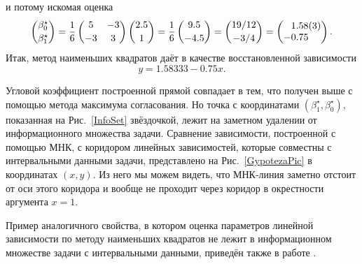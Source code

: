 \documentclass[a5paper,openany]{book}
\newcounter{IreneExmp}
\begin{document}
и потому искомая оценка 
\begin{equation*}
\begin{pmatrix}\beta_{0}^{\star} \\[2pt] \beta_{1}^{\star}\end{pmatrix} 
= 
\frac{1}{6}\begin{pmatrix} 5 &-3\\[2pt] -3 & 3 \end{pmatrix}
\begin{pmatrix} 2.5\\[2pt] 1 \end{pmatrix}=
\frac{1}{6}\begin{pmatrix} 9.5\\[2pt] -4.5 \end{pmatrix}=
\begin{pmatrix} 19/12 \\[2pt] -3/4 \end{pmatrix}=%
\left(\begin{array}{@{}r@{.}l@{}}1&58(3)\\ -0&75\end{array}\right). 
\end{equation*} 
Итак, метод наименьших квадратов даёт в качестве восстановленной зависимости 
\begin{equation*}
y = 1.58333 - 0.75x. 
\end{equation*}
  
Угловой коэффициент построенной прямой совпадает в тем, что получен выше 
с помощью метода максимума согласования. Но точка с координатами $(\beta_{1}^{\star}, 
\beta_{0}^{\star})$, показанная на Рис.~\ref{InfoSet} звёздочкой, лежит на заметном 
удалении от информационного множества задачи. Сравнение зависимости, построенной 
с помощью МНК, с коридором линейных зависимостей, которые совместны с интервальными 
данными задачи, представлено на Рис.~\ref{GypotezaPic} в координатах $(x,y)$. Из него 
мы можем видеть, что МНК-линия заметно отстоит от оси этого коридора и вообще 
не проходит через коридор в окрестности аргумента $x = 1$. 
  
  
Пример аналогичного свойства, в котором оценка параметров линейной зависимости 
по методу наименьших квадратов  не лежит в информационном множестве задачи 
с интервальными данными, приведён также в работе \cite{VoschiBochkovSotirov}. 
  
\end{document}
